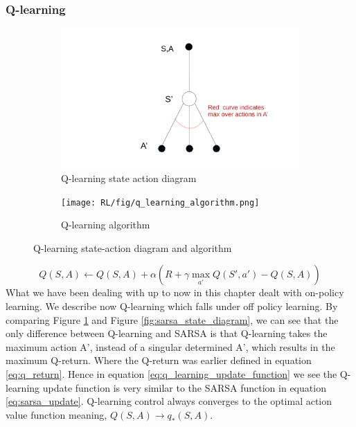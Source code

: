 \subsubsection{Q-learning}
\begin{figure}[!htb]
	\begin{subfigure}{0.5\textwidth}
		\centering
		\includegraphics[width=1\linewidth]{RL/fig/q_learning_state_diagram.pdf}
		\caption{Q-learning state action diagram\cite{David_Silver}}
		\label{fig:q_learning_state_action_diagram}
	\end{subfigure}
	\begin{subfigure}{0.5\textwidth}
		\centering
		\texttt{[image: RL/fig/q\_learning\_algorithm.png]}
		\caption{Q-learning algorithm\cite{David_Silver}}
		\label{fig:q_learning_algorithm}
	\end{subfigure}
	\caption{Q-learning state-action diagram and algorithm}
	\label{Q-learning}
\end{figure}
\begin{equation}
	Q(S,A) \leftarrow Q(S,A) + \alpha(R + \gamma\max\limits_{a'}Q(S',a') - Q(S,A))
	\label{eq:q_learning_update_function}
\end{equation}
What we have been dealing with up to now in this chapter dealt with on-policy learning.
We describe now Q-learning which falls under off policy learning. By comparing Figure \ref{fig:q_learning_state_action_diagram} and Figure \ref{fig:sarsa_state_diagram}, we can see that the only difference between Q-learning and SARSA is that Q-learning takes the maximum action A', instead of a singular determined A', which results in the maximum Q-return. Where the Q-return was earlier defined in equation \ref{eq:q_return}.
Hence in equation \ref{eq:q_learning_update_function} we see the Q-learning update function is very similar to the SARSA function in equation \ref{eq:sarsa_update}.
Q-learning control always converges to the optimal action value function meaning, $Q(S,A) \to q_*(S,A)$. 
